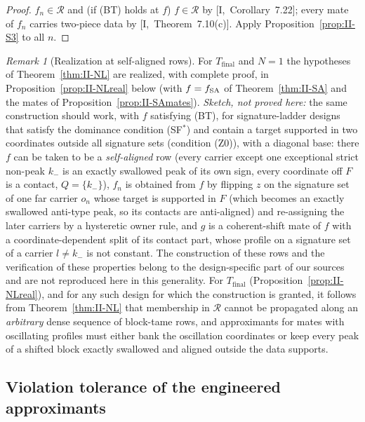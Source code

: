 \documentclass[10pt]{amsart}
\theoremstyle{definition}
\theoremstyle{remark}
\newtheorem{remark}[theorem]{Remark}
\newcommand{\Rec}{\mathcal R}
\begin{document}
\begin{proof}
$f_n\in\Rec$ and (if (BT) holds at $f$) $f\in\Rec$ by [I,~Corollary~7.22];
every mate of $f_n$ carries two-piece data by [I,~Theorem~7.10(c)].  Apply
Proposition~\ref{prop:II-S3} to all $n$.
\end{proof}

\begin{remark}[Realization at self-aligned rows]\label{rem:II-NL}
For $T_{\mathrm{final}}$ and $N=1$ the hypotheses of
Theorem~\ref{thm:II-NL} are realized, with complete proof, in
Proposition~\ref{prop:II-NLreal} below (with $f=f_{\rm SA}$ of
Theorem~\ref{thm:II-SA} and the mates of
Proposition~\ref{prop:II-SAmates}).  \emph{Sketch, not proved here:} the
same construction should work, with $f$ satisfying \textup{(BT)}, for
signature-ladder designs that satisfy the dominance
condition (SF$^*$) and contain a target supported in two coordinates outside
all signature sets (condition (Z0)), with a diagonal base: there $f$ can be
taken to be a \emph{self-aligned} row (every carrier except one exceptional
strict non-peak $k_-$ is an exactly swallowed peak of its own sign, every
coordinate off $F$ is a contact, $Q=\{k_-\}$), $f_n$ is obtained from $f$ by
flipping $z$ on the signature set of one far carrier $o_n$ whose target is
supported in $F$ (which becomes an exactly swallowed anti-type peak, so its
contacts are anti-aligned) and re-assigning the later carriers by a
hysteretic owner rule, and $g$ is a coherent-shift mate of $f$ with a
coordinate-dependent split of its contact part, whose profile on a signature
set of a carrier $l\ne k_-$ is not constant.  The construction of these rows
and the verification of these properties belong to the design-specific part
of our sources and are not reproduced here in this generality.  For
$T_{\mathrm{final}}$ (Proposition~\ref{prop:II-NLreal}), and for any such
design for which the construction is granted, it follows from
Theorem~\ref{thm:II-NL} that membership in $\Rec$ cannot be propagated along an \emph{arbitrary} dense
sequence of block-tame rows, and approximants for mates with oscillating
profiles must either bank the oscillation coordinates or keep every peak of a
shifted block exactly swallowed and aligned outside the data supports.
\end{remark}

\subsection{Violation tolerance of the engineered approximants}\label{subsec:II-VT}
\end{document}
